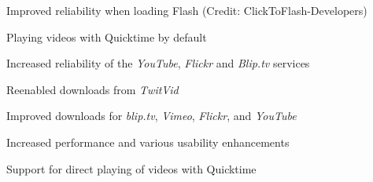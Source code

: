\begin{changelog}
\item Improved reliability when loading Flash (Credit: ClickToFlash-Developers)
\item Playing videos with Quicktime by default
\end{changelog}

\begin{changelog}
\item Increased reliability of the \emph{YouTube}, \emph{Flickr} and \emph{Blip.tv} services
\item Reenabled downloads from \emph{TwitVid}
\end{changelog}

\begin{changelog}
\item Improved downloads for \emph{blip.tv}, \emph{Vimeo}, \emph{Flickr}, and \emph{YouTube}
\end{changelog}

\begin{changelog}
\item Increased performance and various usability enhancements
\item Support for direct playing of videos with Quicktime
\end{changelog}
